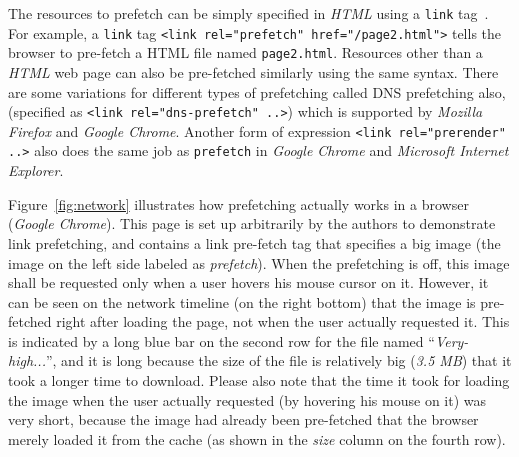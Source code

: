 The resources to prefetch can be simply specified in {\it HTML} using a {\tt link} tag~\cite{nottingham2010}.
For example, a {\tt link} tag {\tt <link rel="p\-refetch" href="/page2.html">} tells the browser to pre-fetch a HTML file named {\tt page2.html}.
Resources other than a {\it HTML} web page can also be pre-fetched similarly using the same syntax.
There are some variations for different types of prefetching called DNS prefetching also, (specified as {\tt <link rel="dns-prefetch" ..>}) which is supported by {\it Mozilla Firefox} and {\it Google Chrome}.
Another form of expression {\tt <link rel="prerender" ..>} also does the same job as {\tt prefetch} in {\it Google Chrome} and {\it Microsoft Internet Explorer}.

Figure~\ref{fig:network} illustrates how prefetching actually works in a browser ({\it Google Chrome}).
This page is set up arbitrarily by the authors to demonstrate link prefetching, and contains a link pre-fetch tag that specifies a big image (the image on the left side labeled as {\it prefetch}).
When the prefetching is off, this image shall be requested only when a user hovers his mouse cursor on it.
However, it can be seen on the network timeline (on the right bottom) that the image is pre-fetched right after loading the page, not when the user actually requested it.
This is indicated by a long blue bar on the second row for the file named ``{\it Very-high...}'', and it is long because the size of the file is relatively big ({\it 3.5 MB}) that it took a longer time to download.
Please also note that the time it took for loading the image when the user actually requested (by hovering his mouse on it) was very short, because the image had already been pre-fetched that the browser merely loaded it from the cache (as shown in the {\it size} column on the fourth row).

